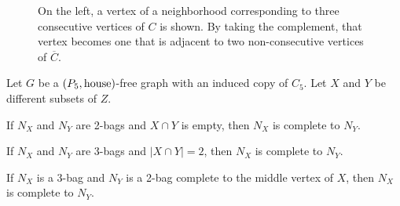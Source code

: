 \begin{figure}[htb!]
    \centering
    \caption{On the left, a vertex of a neighborhood corresponding to three
    consecutive vertices of $C$ is shown. By taking the complement, that vertex
    becomes one that is adjacent to two non-consecutive vertices of
    $\overline{C}$.}
    \label{fig:complement}
\end{figure}

\begin{lemma}
    \label{lem:neighborhoods_c5_complete}
    Let $G$ be a $\left(P_5,\text{house}\right)$-free graph with an induced copy of
    $C_5$. Let $X$ and $Y$ be different subsets of $Z$.
    \begin{lemenum}
        \item If $N_X$ and $N_Y$ are 2-bags and $X\cap Y$ is empty, then $N_X$
            is complete to $N_Y$. \label{lem:c5_comp_1}
        \item If $N_X$ and $N_Y$ are 3-bags and $|X\cap Y|=2$, then $N_X$ is
            complete to $N_Y$.\label{lem:c5_comp_2}
        \item If $N_X$ is a 3-bag and $N_Y$ is a 2-bag complete to the middle
            vertex of $X$, then $N_X$ is complete to $N_Y$.
            \label{lem:c5_comp_3}
    \end{lemenum}
\end{lemma}

